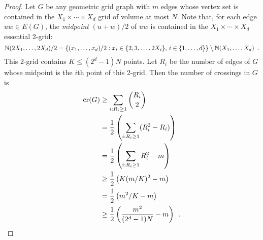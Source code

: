 \documentclass{patmorin}
\newcommand{\n}{N}
\DeclareMathOperator{\crs}{cr}
\begin{document}
\begin{proof}
  Let $G$ be any geometric grid graph with $m$ edges whose vertex set
  is contained in the $X_1\times \cdots\times X_d$ grid of volume
  at most $\n$.  Note that,
  for each edge $uw\in E(G)$, the \emph{midpoint} $(u+w)/2$ of $uw$
  is contained in the $X_1\times\cdots\times X_d$ essential 2-grid:
  \[
    \mathbb{N}(2X_1,\ldots,2X_d)/2=\{(x_1,\ldots,x_d)/2:
         \mbox{$x_i \in \{2,3,\ldots,2X_i\}$, 
               $i\in\{1,\ldots,d\}$}\} \setminus \mathbb{N}(X_1,\ldots,X_d)\enspace .
  \]
  This 2-grid contains $K\le (2^d-1)\n$ points.  Let $R_i$ be the number of
  edges of $G$ whose midpoint is the $i$th point of this 2-grid. Then
  the number of crossings in $G$ is
  \begin{align*}
   \crs(G) &\ge \sum_{i:R_i\ge 1}\binom{R_i}{2} \\
    & = \frac{1}{2}\left(\sum_{i:R_i\ge 1}(R_i^2-R_i)\right) \\
    & = \frac{1}{2}\left(\sum_{i:R_i\ge 1} R_i^2 - m\right) \\
    & \ge \frac{1}{2}\left(K(m/K)^2 - m\right) \\
    & = \frac{1}{2}\left(m^2/K - m\right) \\
    & \ge \frac{1}{2}\left(\frac{m^2}{(2^{d}-1)\n} - m\right) \enspace . \qedhere
  \end{align*}
%
\end{proof}
\end{document}
